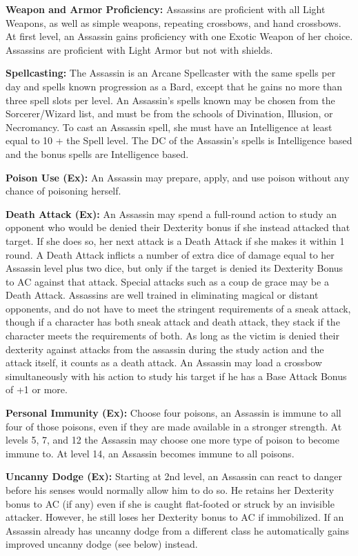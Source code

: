 \documentclass[10pt]{article}
\newcommand{\ability}[2]{\smallskip \noindent \textbf{#1} #2}
\begin{document}
\ability{Weapon and Armor Proficiency:}{Assassins are proficient with all Light Weapons, as well as simple weapons, repeating crossbows, and hand crossbows. At first level, an Assassin gains proficiency with one Exotic Weapon of her choice. Assassins are proficient with Light Armor but not with shields.}

\ability{Spellcasting:}{The Assassin is an Arcane Spellcaster with the same spells per day and spells known progression as a Bard, except that he gains no more than three spell slots per level. An Assassin's spells known may be chosen from the Sorcerer/Wizard list, and must be from the schools of Divination, Illusion, or Necromancy. To cast an Assassin spell, she must have an Intelligence at least equal to 10 + the Spell level. The DC of the Assassin's spells is Intelligence based and the bonus spells are Intelligence based.}

\ability{Poison Use (Ex):}{An Assassin may prepare, apply, and use poison without any chance of poisoning herself.}

\ability{Death Attack (Ex):}{An Assassin may spend a full-round action to study an opponent who would be denied their Dexterity bonus if she instead attacked that target. If she does so, her next attack is a Death Attack if she makes it within 1 round. A Death Attack inflicts a number of extra dice of damage equal to her Assassin level plus two dice, but only if the target is denied its Dexterity Bonus to AC against that attack. Special attacks such as a coup de grace may be a Death Attack. Assassins are well trained in eliminating magical or distant opponents, and do not have to meet the stringent requirements of a sneak attack, though if a character has both sneak attack and death attack, they stack if the character meets the requirements of both. As long as the victim is denied their dexterity against attacks from the assassin during the study action and the attack itself, it counts as a death attack. An Assassin may load a crossbow simultaneously with his action to study his target if he has a Base Attack Bonus of +1 or more.}

\ability{Personal Immunity (Ex):}{Choose four poisons, an Assassin is immune to all four of those poisons, even if they are made available in a stronger strength. At levels 5, 7, and 12 the Assassin may choose one more type of poison to become immune to. At level 14, an Assassin becomes immune to all poisons.}

\ability{Uncanny Dodge (Ex):}{Starting at 2nd level, an Assassin can react to danger before his senses would normally allow him to do so. He retains her Dexterity bonus to AC (if any) even if she is caught flat-footed or struck by an invisible attacker. However, he still loses her Dexterity bonus to AC if immobilized. If an Assassin already has uncanny dodge from a different class he automatically gains improved uncanny dodge (see below) instead.}
\end{document}

